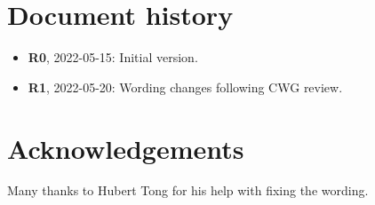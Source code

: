
\section*{Document history}

\begin{itemize}
\item \textbf{R0}, 2022-05-15: Initial version.
\item \textbf{R1}, 2022-05-20: Wording changes following CWG review.
\end{itemize}


\section*{Acknowledgements}

Many thanks to Hubert Tong for his help with fixing the wording.


\renewcommand{\bibname}{References}



